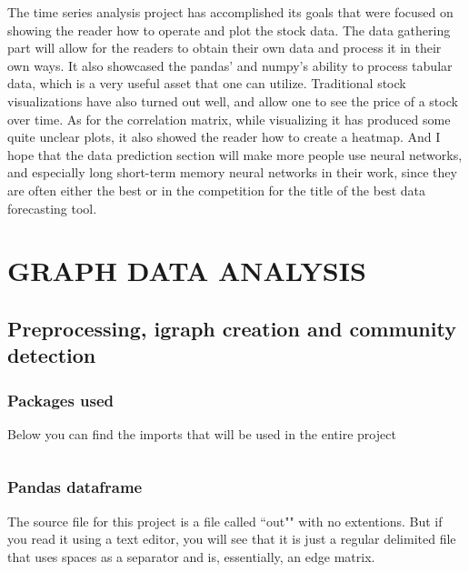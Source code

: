 \documentclass[12pt, a4paper]{article}
\begin{document}
The time series analysis project has accomplished its goals that were focused on showing the reader how to operate and plot the stock data.
The data gathering part will allow for the readers to obtain their own data and process it in their own ways. It also showcased the pandas' and numpy's ability to process tabular data, which is a very useful asset that one can  utilize.
Traditional stock visualizations have also turned out well, and allow one to see the price of a stock over time. As for the correlation matrix, while visualizing it has produced some quite unclear plots, it also showed the reader how to create a heatmap.
And I hope that the data prediction section will make more people use neural networks, and especially long short-term memory neural networks in their work, since they are often either the best or in the competition for the title of the best data forecasting tool.

\newpage
\section{GRAPH DATA ANALYSIS}
\subsection{Preprocessing, igraph creation and community detection}
\subsubsection{Packages used}

Below you can find the imports that will be used in the entire project

\bgroup
  \inputminted[linenos, breaklines=true, fontsize=\scriptsize]{python}{src/youtube/imports.py}
  \label{listing:youtube_0_imports}
\egroup

\subsubsection{Pandas dataframe}

The source file for this project is a file called ``out"" with no extentions. But if you read it using a text editor, you will see that it is just a regular delimited file that uses spaces as a separator and is, essentially, an edge matrix.
\end{document}
